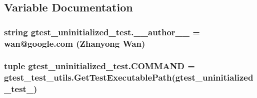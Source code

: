 \subsection{Variable Documentation}
\hypertarget{namespacegtest__uninitialized__test_aaaf66027b4590f6f1da732c0b2716e10}{}
\subsubsection[{\+\_\+\+\_\+author\+\_\+\+\_\+}]{\setlength{\rightskip}{0pt plus 5cm}string gtest\+\_\+uninitialized\+\_\+test.\+\_\+\+\_\+author\+\_\+\+\_\+ = \textquotesingle{}wan@google.\+com (Zhanyong Wan)\textquotesingle{}}\label{namespacegtest__uninitialized__test_aaaf66027b4590f6f1da732c0b2716e10}
\hypertarget{namespacegtest__uninitialized__test_a6341d3bb32a80c46bcca4fe5c72adf3f}{}
\subsubsection[{C\+O\+M\+M\+A\+N\+D}]{\setlength{\rightskip}{0pt plus 5cm}tuple gtest\+\_\+uninitialized\+\_\+test.\+C\+O\+M\+M\+A\+N\+D = {\bf gtest\+\_\+test\+\_\+utils.\+Get\+Test\+Executable\+Path}(\textquotesingle{}gtest\+\_\+uninitialized\+\_\+test\+\_\+\textquotesingle{})}\label{namespacegtest__uninitialized__test_a6341d3bb32a80c46bcca4fe5c72adf3f}

